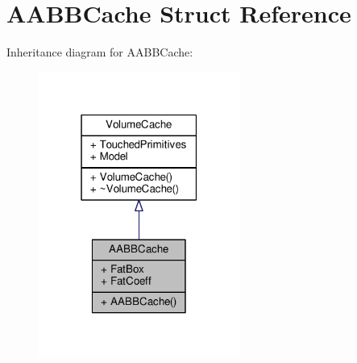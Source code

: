 \hypertarget{structAABBCache}{}\section{A\+A\+B\+B\+Cache Struct Reference}
\label{structAABBCache}


Inheritance diagram for A\+A\+B\+B\+Cache\+:
\nopagebreak
\begin{figure}[H]
\begin{center}
\leavevmode
\includegraphics[width=187pt]{d2/d80/structAABBCache__inherit__graph}
\end{center}
\end{figure}


